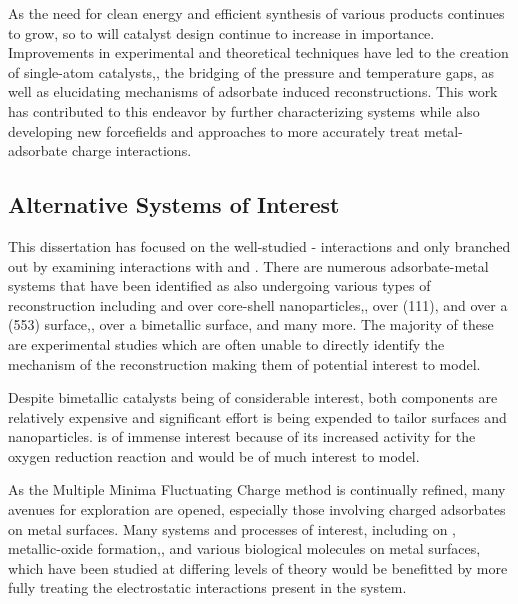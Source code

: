 As the need for clean energy and efficient synthesis of various products
continues to grow, so to will catalyst design continue to increase in
importance.  Improvements in experimental and theoretical techniques have led
to the creation of single-atom catalysts,\citep{}, the bridging of the pressure
and temperature gaps,\citep{} as well as elucidating mechanisms of adsorbate
induced reconstructions.\citep{} This work has contributed to this endeavor by
further characterizing  systems while also developing new
forcefields and approaches to more accurately treat metal-adsorbate charge
interactions.



\subsection{Alternative Systems of Interest}
This dissertation has focused on the well-studied - interactions
and only branched out by examining  interactions with  and
.  There are numerous adsorbate-metal systems that have been identified
as also undergoing various types of reconstruction including  and
 over  core-shell nanoparticles,\citep{Tao:2008aa},
 over  (111),\citep{Eren:2016qt}  and  over a (553)
 surface,\citep{Zhang:2015zr},  over a  bimetallic
surface,\citep{Kim:2013mi} and many more. The majority of these are experimental
studies which are often unable to directly identify the mechanism of the
reconstruction making them of potential interest to model.

Despite  bimetallic catalysts being of considerable interest,
both components are relatively expensive and significant effort is being
expended to tailor  surfaces and nanoparticles.
 is of immense interest because of its increased activity for
the oxygen reduction reaction and would be of much interest to
model.\citep{Tuaev:2013fk, Stamenkovic:2007kk,Sneed:2014fj}

As the Multiple Minima Fluctuating Charge method is continually refined, many
avenues for exploration are opened, especially those involving charged
adsorbates on metal surfaces. Many systems and processes of interest, including
 on ,\citep{Xu:0dz} metallic-oxide
formation,\citep{Streitz:1994mw, Fantauzzi:2014pb, Lloyd:2016jt}, and various
biological molecules on metal surfaces,\citep{Padmos:0qf, Mete:2015rc} which
have been studied at differing levels of theory would be benefitted by more
fully treating the electrostatic interactions present in the system. 
